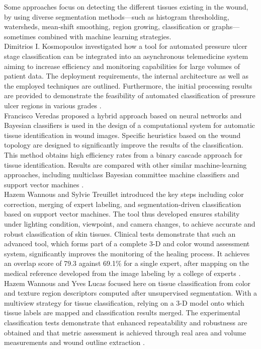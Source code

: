 Some approaches focus on detecting the different tissues existing in the wound, by using diverse segmentation methods—such as histogram thresholding, watersheds, mean-shift smoothing, region growing, classification or graphs—sometimes combined with machine learning strategies. \\

Dimitrios I. Kosmopoulos investigated how a tool for automated pressure ulcer stage classification can be integrated into an asynchronous telemedicine system aiming to increase efficiency and monitoring capabilities for large volumes of patient
data. The deployment requirements, the internal architecture as well as the employed
techniques are outlined. Furthermore, the initial processing results are provided to
demonstrate the feasibility of automated classification of pressure ulcer regions in various grades \cite{Kosmopoulos}.\\

Francisco Veredas proposed a hybrid approach based on neural networks and Bayesian
classifiers is used in the design of a computational system for automatic tissue identification in wound images. Specific heuristics based on the wound topology are designed to significantly improve the results of the classification. This method obtains high efficiency rates from a binary cascade approach for tissue identification. Results are compared with other similar machine-learning approaches, including multiclass Bayesian committee machine classifiers and support vector machines \cite{Veredas}. \\

Hazem Wannous and Sylvie Treuillet introduced the key steps including color correction, merging of expert labeling, and segmentation-driven classification based on support vector machines. The tool thus developed ensures stability under lighting condition,
viewpoint, and camera changes, to achieve accurate and robust classification of skin tissues. Clinical tests demonstrate that such an advanced tool, which forms part of a complete 3-D and color wound assessment system, significantly improves the monitoring
of the healing process. It achieves an overlap score of 79.3 against 69.1\% for a single expert, after mapping on the medical reference developed from the image labeling by a college of experts \cite{Wannous}.\\

Hazem Wannous and  Yves Lucas focused here on tissue classification from color and texture region descriptors computed after unsupervised segmentation. With a multiview strategy for tissue classification, relying on a 3-D model onto which tissue labels
are mapped and classification results merged. The experimental classification tests demonstrate that enhanced repeatability and robustness are obtained and that metric assessment is achieved through real area and volume measurements and wound outline
extraction \cite{Treuillet}. \\

